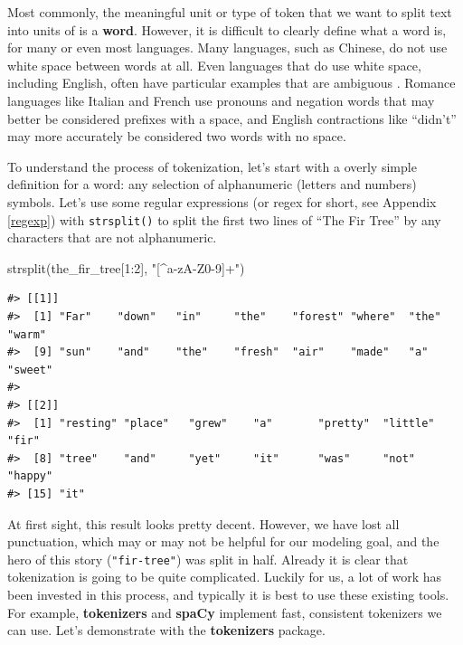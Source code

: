 \documentclass[
]{krantz}
\makeatletter
\newenvironment{Shaded}{\begin{snugshade}}{\end{snugshade}}
\newcommand{\DecValTok}[1]{\textcolor[rgb]{0.00,0.00,0.81}{#1}}
\newcommand{\FunctionTok}[1]{\textcolor[rgb]{0.00,0.00,0.00}{#1}}
\newcommand{\NormalTok}[1]{#1}
\newcommand{\SpecialCharTok}[1]{\textcolor[rgb]{0.00,0.00,0.00}{#1}}
\newcommand{\StringTok}[1]{\textcolor[rgb]{0.31,0.60,0.02}{#1}}
\newenvironment{kframe}{%
\medskip{}
\setlength{\fboxsep}{.8em}
 \def\at@end@of@kframe{}%
 \ifinner\ifhmode%
  \def\at@end@of@kframe{\end{minipage}}%
  \begin{minipage}{\columnwidth}%
 \fi\fi%
 \def\FrameCommand##1{\hskip\@totalleftmargin \hskip-\fboxsep
 \colorbox{shadecolor}{##1}\hskip-\fboxsep
     \hskip-\linewidth \hskip-\@totalleftmargin \hskip\columnwidth}%
 \MakeFramed {\advance\hsize-\width
   \@totalleftmargin\z@ \linewidth\hsize
   \@setminipage}}%
 {\par\unskip\endMakeFramed%
 \at@end@of@kframe}
\renewenvironment{Shaded}{\begin{kframe}}{\end{kframe}}
\makeatother
\begin{document}
Most commonly, the meaningful unit or type of token that we want to split text into units of is a \textbf{word}. However, it is difficult to clearly define what a word is, for many or even most languages. Many languages, such as Chinese, do not use white space between words at all. Even languages that do use white space, including English, often have particular examples that are ambiguous \citep{Bender13}. Romance languages like Italian and French use pronouns and negation words that may better be considered prefixes with a space, and English contractions like ``didn't'' may more accurately be considered two words with no space.

To understand the process of tokenization, let's start with a overly simple definition for a word: any selection of alphanumeric (letters and numbers) symbols. Let's use some regular expressions (or regex for short, see Appendix \ref{regexp}) with \texttt{strsplit()} to split the first two lines of ``The Fir Tree'' by any characters that are not alphanumeric.

\begin{Shaded}
\begin{Highlighting}[]
\FunctionTok{strsplit}\NormalTok{(the\_fir\_tree[}\DecValTok{1}\SpecialCharTok{:}\DecValTok{2}\NormalTok{], }\StringTok{"[\^{}a{-}zA{-}Z0{-}9]+"}\NormalTok{)}
\end{Highlighting}
\end{Shaded}

\begin{verbatim}
#> [[1]]
#>  [1] "Far"    "down"   "in"     "the"    "forest" "where"  "the"    "warm"  
#>  [9] "sun"    "and"    "the"    "fresh"  "air"    "made"   "a"      "sweet" 
#> 
#> [[2]]
#>  [1] "resting" "place"   "grew"    "a"       "pretty"  "little"  "fir"    
#>  [8] "tree"    "and"     "yet"     "it"      "was"     "not"     "happy"  
#> [15] "it"
\end{verbatim}

At first sight, this result looks pretty decent. However, we have lost all punctuation, which may or may not be helpful for our modeling goal, and the hero of this story (\texttt{"fir-tree"}) was split in half. Already it is clear that tokenization is going to be quite complicated. Luckily for us, a lot of work has been invested in this process, and typically it is best to use these existing tools. For example, \textbf{tokenizers} \citep{Mullen18} and \textbf{spaCy} \citep{spacy2} implement fast, consistent tokenizers we can use. Let's demonstrate with the \textbf{tokenizers} package.
\end{document}
